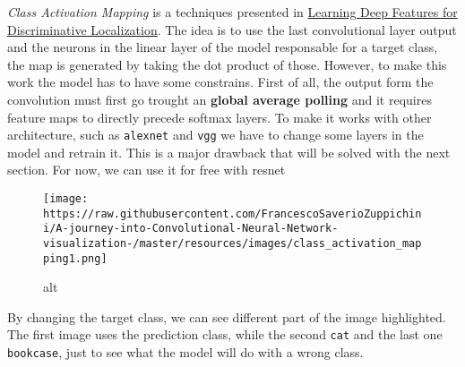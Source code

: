 \documentclass[11pt]{article}
\makeatletter
\def\maxwidth{\ifdim\Gin@nat@width>\linewidth\linewidth
    \else\Gin@nat@width\fi}
\let\Oldincludegraphics\includegraphics
\renewcommand{\includegraphics}[1]{\Oldincludegraphics[width=.8\maxwidth]{#1}}
\makeatother
\begin{document}
\emph{Class Activation Mapping} is a techniques presented in
\href{https://arxiv.org/pdf/1512.04150.pdf}{Learning Deep Features for
Discriminative Localization}. The idea is to use the last convolutional
layer output and the neurons in the linear layer of the model
responsable for a target class, the map is generated by taking the dot
product of those. However, to make this work the model has to have some
constrains. First of all, the output form the convolution must first go
trought an \textbf{global average polling} and it requires feature maps
to directly precede softmax layers. To make it works with other
architecture, such as \texttt{alexnet} and \texttt{vgg} we have to
change some layers in the model and retrain it. This is a major drawback
that will be solved with the next section. For now, we can use it for
free with resnet

\begin{figure}
\centering
\texttt{[image: https://raw.githubusercontent.com/FrancescoSaverioZuppichini/A-journey-into-Convolutional-Neural-Network-visualization-/master/resources/images/class\_activation\_mapping1.png]}
\caption{alt}
\end{figure}

    By changing the target class, we can see different part of the image
highlighted. The first image uses the prediction class, while the second
\texttt{cat} and the last one \texttt{bookcase}, just to see what the
model will do with a wrong class.
\end{document}
